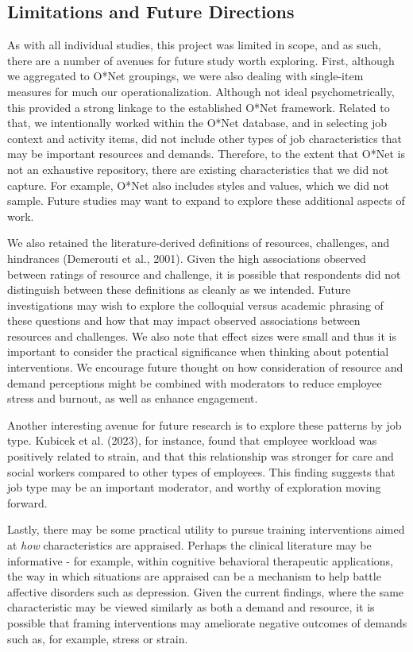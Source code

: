 \documentclass[
  man]{apa7}
\begin{document}
\hypertarget{limitations-and-future-directions}{%
\subsection{Limitations and Future Directions}\label{limitations-and-future-directions}}

As with all individual studies, this project was limited in scope, and as such, there are a number of avenues for future study worth exploring. First, although we aggregated to O*Net groupings, we were also dealing with single-item measures for much our operationalization. Although not ideal psychometrically, this provided a strong linkage to the established O*Net framework. Related to that, we intentionally worked within the O*Net database, and in selecting job context and activity items, did not include other types of job characteristics that may be important resources and demands. Therefore, to the extent that O*Net is not an exhaustive repository, there are existing characteristics that we did not capture. For example, O*Net also includes styles and values, which we did not sample. Future studies may want to expand to explore these additional aspects of work.

We also retained the literature-derived definitions of resources, challenges, and hindrances (Demerouti et al., 2001). Given the high associations observed between ratings of resource and challenge, it is possible that respondents did not distinguish between these definitions as cleanly as we intended. Future investigations may wish to explore the colloquial versus academic phrasing of these questions and how that may impact observed associations between resources and challenges. We also note that effect sizes were small and thus it is important to consider the practical significance when thinking about potential interventions. We encourage future thought on how consideration of resource and demand perceptions might be combined with moderators to reduce employee stress and burnout, as well as enhance engagement.

Another interesting avenue for future research is to explore these patterns by job type. Kubicek et al. (2023), for instance, found that employee workload was positively related to strain, and that this relationship was stronger for care and social workers compared to other types of employees. This finding suggests that job type may be an important moderator, and worthy of exploration moving forward.

Lastly, there may be some practical utility to pursue training interventions aimed at \emph{how} characteristics are appraised. Perhaps the clinical literature may be informative - for example, within cognitive behavioral therapeutic applications, the way in which situations are appraised can be a mechanism to help battle affective disorders such as depression. Given the current findings, where the same characteristic may be viewed similarly as both a demand and resource, it is possible that framing interventions may ameliorate negative outcomes of demands such as, for example, stress or strain.
\end{document}
